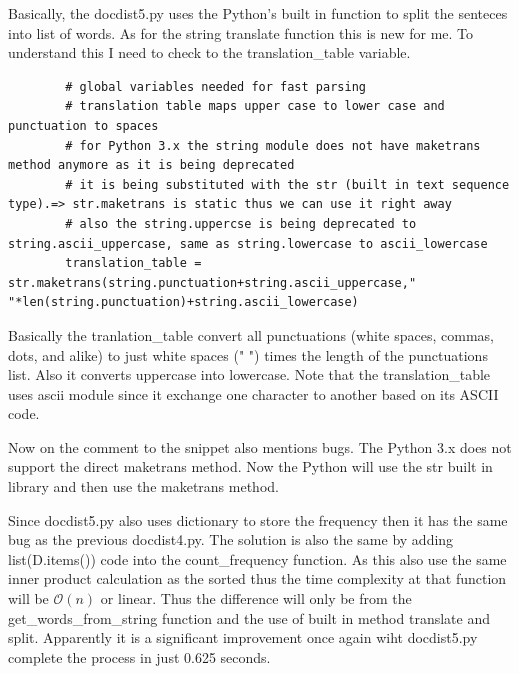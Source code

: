 \documentclass{article}
\begin{document}
    Basically, the docdist5.py uses the Python's built in function to split the senteces into list of words.
    As for the string translate function this is new for me.
    To understand this I need to check to the translation\_table variable. 
    \begin{lstlisting}
        # global variables needed for fast parsing
        # translation table maps upper case to lower case and punctuation to spaces
        # for Python 3.x the string module does not have maketrans method anymore as it is being deprecated
        # it is being substituted with the str (built in text sequence type).=> str.maketrans is static thus we can use it right away
        # also the string.uppercse is being deprecated to string.ascii_uppercase, same as string.lowercase to ascii_lowercase
        translation_table = str.maketrans(string.punctuation+string.ascii_uppercase," "*len(string.punctuation)+string.ascii_lowercase)
    \end{lstlisting}
    Basically the tranlation\_table convert all punctuations (white spaces, commas, dots, and alike) to just white spaces (" ") times the length of the punctuations list.
    Also it converts uppercase into lowercase.
    Note that the translation\_table uses ascii module since it exchange one character to another based on its ASCII code.

    Now on the comment to the snippet also mentions bugs.
    The Python 3.x does not support the direct maketrans method.
    Now the Python will use the str built in library and then use the maketrans method.

    Since docdist5.py also uses dictionary to store the frequency then it has the same bug as the previous docdist4.py.
    The solution is also the same by adding list(D.items()) code into the count\_frequency function.
    As this also use the same inner product calculation as the sorted thus the time complexity at that function will be $\mathcal{O}(n)$ or linear.
    Thus the difference will only be from the get\_words\_from\_string function and the use of built in method translate and split. 
    Apparently it is a significant improvement once again wiht docdist5.py complete the process in just 0.625 seconds.
\end{document}
